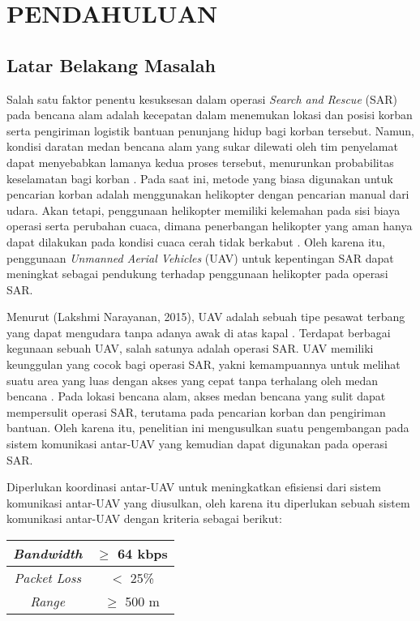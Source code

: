 \documentclass[main]{subfiles}
\begin{document}
\pagestyle{myheadings} %

\chapter{PENDAHULUAN}
\section{Latar Belakang Masalah}
Salah satu faktor penentu kesuksesan dalam operasi \textit{Search and Rescue} (SAR) pada bencana alam adalah kecepatan dalam menemukan lokasi dan posisi korban serta pengiriman logistik bantuan penunjang hidup bagi korban tersebut. Namun, kondisi daratan medan bencana alam yang sukar dilewati oleh tim penyelamat dapat menyebabkan lamanya kedua proses tersebut, menurunkan probabilitas keselamatan bagi korban \cite{syafitriAutonomousDisasterVictim2020}. Pada saat ini, metode yang biasa digunakan untuk pencarian korban adalah menggunakan helikopter dengan pencarian manual dari udara. Akan tetapi, penggunaan helikopter memiliki kelemahan pada sisi biaya operasi serta perubahan cuaca, dimana penerbangan helikopter yang aman hanya dapat dilakukan pada kondisi cuaca cerah tidak berkabut \cite{shimanskiRisksMountainRescue2008}. Oleh karena itu, penggunaan \textit{Unmanned Aerial Vehicles} (UAV) untuk kepentingan SAR dapat meningkat sebagai pendukung terhadap penggunaan helikopter pada operasi SAR.

Menurut (Lakshmi Narayanan, 2015), UAV adalah sebuah tipe pesawat terbang yang dapat mengudara tanpa adanya awak di atas kapal \cite{lakshminarayananJointNetworkDisaster2015}. Terdapat berbagai kegunaan sebuah UAV, salah satunya adalah operasi SAR. UAV memiliki keunggulan yang cocok bagi operasi SAR, yakni kemampuannya untuk melihat suatu area yang luas dengan akses yang cepat tanpa terhalang oleh medan bencana \cite{DronesSearchRescue}. Pada lokasi bencana alam, akses medan bencana yang sulit dapat mempersulit operasi SAR, terutama pada pencarian korban dan pengiriman bantuan. Oleh karena itu, penelitian ini mengusulkan suatu pengembangan pada sistem komunikasi antar-UAV yang kemudian dapat digunakan pada operasi SAR.

Diperlukan koordinasi antar-UAV untuk meningkatkan efisiensi dari sistem komunikasi antar-UAV yang diusulkan, oleh karena itu diperlukan sebuah sistem komunikasi antar-UAV dengan kriteria sebagai berikut:

\begin{center}
	\begin{tabular}{|c|c|}
		\hline
		\textit{Bandwidth} & $\geq$ 64 kbps \\
		\hline
		\textit{Packet Loss} & $<$ 25\% \\
		\hline
		\textit{Range} &  $\geq$ 500 m\\
		\hline
	\end{tabular}
\end{center}
\end{document}
